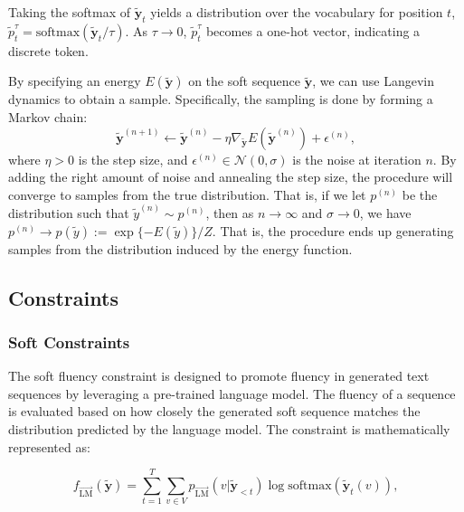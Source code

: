 \documentclass{article}
\begin{document}
Taking the softmax of $\tilde{\boldsymbol{y}}_t$ yields a distribution over the vocabulary for position $t$, $\tilde{p}_t^\tau = \text{softmax}(\tilde{\boldsymbol{y}}_t/\tau)$. As $\tau \rightarrow 0$, $\tilde{p}_t^\tau$ becomes a one-hot vector, indicating a discrete token.

By specifying an energy $E(\tilde{\boldsymbol{y}})$ on the soft sequence $\tilde{\boldsymbol{y}}$, we can use Langevin dynamics to obtain a sample. Specifically, the sampling is done by forming a Markov chain:
\begin{equation}
    \tilde{\boldsymbol{y}}^{(n+1)} \leftarrow \tilde{\boldsymbol{y}}^{(n)} - \eta \nabla_{\tilde{\boldsymbol{y}}} E(\tilde{\boldsymbol{y}}^{(n)}) + \epsilon^{(n)},
    \label{eq:langevin}
\end{equation}
where $\eta > 0$ is the step size, and $\epsilon^{(n)} \in \mathcal{N}(0, \sigma)$ is the noise at iteration $n$. By adding the right amount of noise and annealing the step size, the procedure will converge to samples from the true distribution. That is, if we let $p^{(n)}$ be the distribution such that $\tilde{y}^{(n)} \sim p^{(n)}$, then as $n \rightarrow \infty$ and $\sigma \rightarrow 0$, we have $p^{(n)} \rightarrow p(\tilde{y}) := \exp\{-E(\tilde{y})\}/Z$. That is, the procedure ends up generating samples from the distribution induced by the energy function.

\subsection{Constraints}
\subsubsection{Soft Constraints}
The soft fluency constraint is designed to promote fluency in generated text sequences by leveraging a pre-trained language model. The fluency of a sequence is evaluated based on how closely the generated soft sequence matches the distribution predicted by the language model. The constraint is mathematically represented as:

\begin{equation}
    f_{\overrightarrow{\text{LM}}}(\mathbf{\tilde{y}}) = \sum_{t=1}^{T} \sum_{v \in V} p_{\overrightarrow{\text{LM}}}(v|\mathbf{\tilde{y}}_{<t}) \log \text{softmax} (\mathbf{\tilde{y}}_t(v)),
\end{equation}
\end{document}

